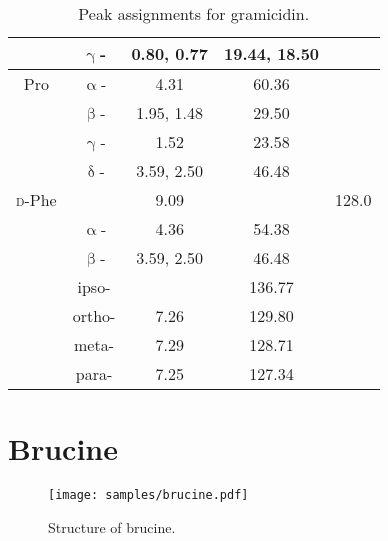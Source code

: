 \begin{table}[!ht]
\begin{tabular}{ccSSS}
                       & $\upgamma$-      & {0.80, 0.77} & {19.44, 18.50} &       \\
        \midrule
        Pro            & $\upalpha$-       & 4.31         & 60.36          &       \\
                       & $\upbeta$-       & {1.95, 1.48} & 29.50          &       \\
                       & $\upgamma$-      & 1.52         & 23.58          &       \\
                       & $\updelta$-      & {3.59, 2.50} & 46.48          &       \\
        \midrule
        \textsc{d}-Phe &                   & 9.09         &                & 128.0 \\
                       & $\upalpha$-       & 4.36         & 54.38          &       \\
                       & $\upbeta$-       & {3.59, 2.50} & 46.48          &       \\
                       & ipso-              &              & 136.77         &       \\
                       & ortho-            & 7.26         & 129.80         &       \\
                       & meta-             & 7.29         & 128.71         &       \\
                       & para-             & 7.25         & 127.34         &       \\
        \bottomrule
    \end{tabular}
    \caption[Peak assignments for gramicidin]{
        Peak assignments for gramicidin.
    }
    \label{tbl:gramicidin_assignments}
\end{table}

\clearpage

\section{Brucine}

\begin{figure}[!ht]
    \centering
    \texttt{[image: samples/brucine.pdf]}%
    \caption[Structure of brucine]{
        Structure of brucine.
    }
    \label{fig:samples_brucine}
\end{figure}

